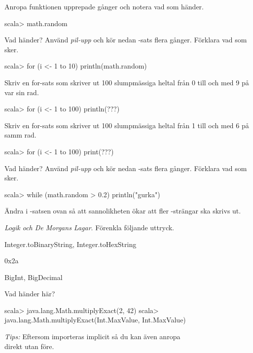 {{{{\Subtask Anropa funktionen  upprepade gånger och notera vad som händer.
\begin{REPL}
scala> math.random
\end{REPL}


\Subtask Vad händer? Använd \textit{pil-upp} och kör nedan -sats flera gånger. Förklara vad som sker.

\begin{REPL}
scala> for (i <- 1 to 10) println(math.random)
\end{REPL}

\Subtask Skriv en for-sats som skriver ut 100 slumpmässiga heltal från 0 till och med 9 på var sin rad. 

\begin{REPL}
scala> for (i <- 1 to 100) println(???)
\end{REPL}

\Subtask Skriv en for-sats som skriver ut 100 slumpmässiga heltal från 1 till och med 6 på samm rad. 

\begin{REPL}
scala> for (i <- 1 to 100) print(???)
\end{REPL}


\Subtask Vad händer? Använd \textit{pil-upp} och kör nedan -sats flera gånger. Förklara vad som sker.

\begin{REPL}
scala> while (math.random > 0.2) { println("gurka") }
\end{REPL}

\Subtask Ändra i -satsen ovan så att sannolikheten ökar att fler -strängar ska skrivs ut.

\Task\Pen \textit{Logik och De Morgans Lagar}. Förenkla följande uttryck. 



\ExtraTasks

\AdvancedTasks

\Task Integer.toBinaryString, Integer.toHexString

\Task 0x2a

\Task 

\Task BigInt, BigDecimal

\Task Vad händer här? 
\begin{REPL}
scala> java.lang.Math.multiplyExact(2, 42)
scala> java.lang.Math.multiplyExact(Int.MaxValue, Int.MaxValue)
\end{REPL}

\noindent \textit{Tips:} Eftersom  importeras implicit så du kan även anropa \\  direkt utan  före.

}}}}
